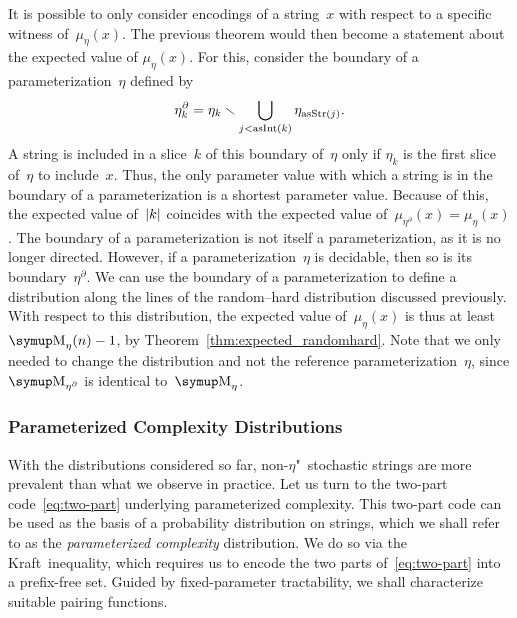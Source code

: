 It is possible to only consider encodings of a string~$x$ with respect to a specific witness of~$\mu_\eta(x)$.
The previous theorem would then become a statement about the expected value of $\mu_\eta(x)$.
For this, consider the boundary of a parameterization~$\eta$ defined by
\begin{equation*}
  \eta^\partial_k = \eta_k \smallsetminus \bigcup_{j < \operatorname{asInt}(k)} \eta_{\operatorname{asStr}(j)}.
\end{equation*}
A string is included in a slice~$k$ of this boundary of~$\eta$ only if $\eta_k$ is the first slice of~$\eta$ to include~$x$.
Thus, the only parameter value with which a string is in the boundary of a parameterization is a shortest parameter value.
Because of this, the expected value of~${\lvert k\rvert}$ coincides with the expected value of~$\mu_{\eta^\partial}(x) = \mu_\eta(x)$.
The boundary of a parameterization is not itself a parameterization, as it is no longer directed.
However, if a parameterization~$\eta$ is decidable, then so is its boundary~$\eta^\partial$.
We can use the boundary of a parameterization to define a distribution along the lines of the random--hard distribution discussed previously.
With respect to this distribution, the expected value of~$\mu_\eta(x)$ is thus at least $\upM_\eta(n) - 1$, by Theorem~\ref{thm:expected_randomhard}.
Note that we only needed to change the distribution and not the reference parameterization~$\eta$, since $\upM_{\eta^\partial}$ is identical to~$\upM_\eta$.

\subsubsection{Parameterized Complexity Distributions}
With the distributions considered so far, non-$\eta$"~stochastic strings are more prevalent than what we observe in practice.
Let us turn to the two-part code~\eqref{eq:two-part} underlying parameterized complexity.
This two-part code can be used as the basis of a probability distribution on strings, which we shall refer to as the \emph{parameterized complexity} distribution.
We do so via the Kraft~inequality, which requires us to encode the two parts of~\eqref{eq:two-part} into a prefix-free set.
Guided by fixed-parameter tractability, we shall characterize suitable pairing functions.

